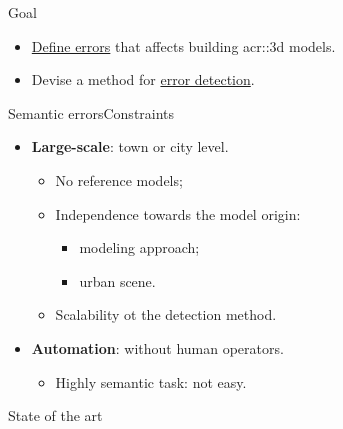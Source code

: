 \documentclass[10pt]{beamer}
\begin{document}
            \begin{frame}{Goal}
                \begin{itemize}[label=$\blacktriangleright$, font=\color{IGNGreen}]
                    \item<1-> \underline{Define errors} that affects building \gls{acr::3d} models.
                    \item<2-> Devise a method for \underline{error detection}.
                \end{itemize}
            \end{frame}

            \begin{frame}{Semantic errors}{Constraints}
                \begin{itemize}[label=$\blacktriangleright$, font=\color{IGNGreen}]
                    \item<1-> \textbf{Large-scale}: town or city level.
                        \begin{itemize}
                            \item<2-6> No reference models;
                            \item<3-6> Independence towards the model origin:
                            \begin{itemize}
                                \item<4-6> modeling approach;
                                \item<5-6> urban scene.
                            \end{itemize}
                            \item<6> Scalability ot the detection method.
                        \end{itemize}
                    \item<7-8> \textbf{Automation}: without human operators.
                        \begin{itemize}
                            \item<8> Highly semantic task: not easy.
                        \end{itemize}
                \end{itemize}
            \end{frame}

        \begin{frame}{State of the art}
            \centering
            
        \end{frame}
\end{document}
